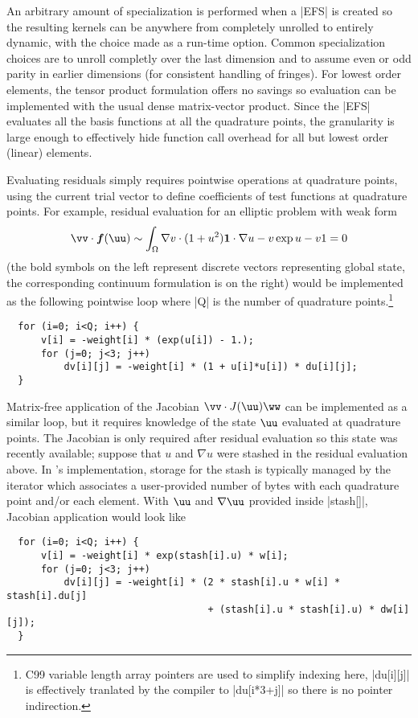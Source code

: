 An arbitrary amount of specialization is performed when a \cverb|EFS| is created so the resulting kernels can be anywhere from completely unrolled to entirely dynamic, with the choice made as a run-time option.
Common specialization choices are to unroll completly over the last dimension and to assume even or odd parity in earlier dimensions (for consistent handling of fringes).
For lowest order elements, the tensor product formulation offers no savings so evaluation can be implemented with the usual dense matrix-vector product.
Since the \cverb|EFS| evaluates all the basis functions at all the quadrature points, the granularity is large enough to effectively hide function call overhead for all but lowest order (linear) elements.

Evaluating residuals simply requires pointwise operations at quadrature points, using the current trial vector to define coefficients of test functions at quadrature points.
For example, residual evaluation for an elliptic problem with weak form
\begin{align*}
  \vv\cdot \bm f(\uu) \sim \int_\Omega \nabla v \cdot (1+u^2)\bm 1 \cdot \nabla u - v \exp u - v 1 = 0
\end{align*}
(the bold symbols on the left represent discrete vectors representing global state, the corresponding continuum formulation is on the right)
would be implemented as the following pointwise loop where \cverb|Q| is the number of quadrature points.\footnote{C99 variable length array pointers are used to simplify indexing here, \cverb|du[i][j]| is effectively tranlated by the compiler to \cverb|du[i*3+j]| so there is no pointer indirection.}
\begin{verbatim}
  for (i=0; i<Q; i++) {
      v[i] = -weight[i] * (exp(u[i]) - 1.);
      for (j=0; j<3; j++)
          dv[i][j] = -weight[i] * (1 + u[i]*u[i]) * du[i][j];
  }
\end{verbatim}
Matrix-free application of the Jacobian $\vv \cdot J(\uu) \ww$ can be implemented as a similar loop, but it requires knowledge of the state $\uu$ evaluated at quadrature points.
The Jacobian is only required after residual evaluation so this state was recently available; suppose that $u$ and $\nabla u$ were stashed in the residual evaluation above.
In \Dohp's implementation, storage for the stash is typically managed by the iterator which associates a user-provided number of bytes with each quadrature point and/or each element.
With $\uu$ and $\nabla\uu$ provided inside \cverb|stash[]|, Jacobian application would look like
\begin{verbatim}
  for (i=0; i<Q; i++) {
      v[i] = -weight[i] * exp(stash[i].u) * w[i];
      for (j=0; j<3; j++)
          dv[i][j] = -weight[i] * (2 * stash[i].u * w[i] * stash[i].du[j]
                                   + (stash[i].u * stash[i].u) * dw[i][j]);
  }
\end{verbatim}

